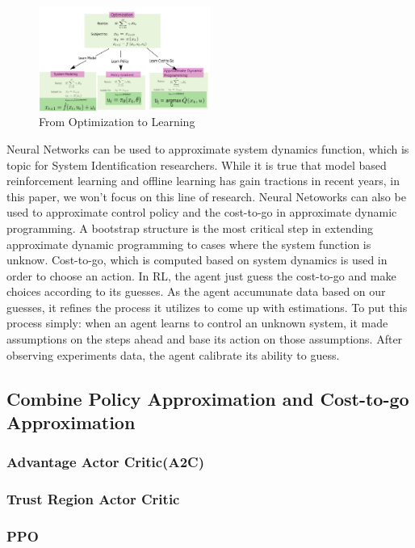 \documentclass[journal]{IEEEtran}
\begin{document}
\begin{figure}
    \centering
    \includegraphics[width=0.5\textwidth]{Control.png}
    \caption{From Optimization to Learning}
    \label{fig:1}
\end{figure}
Neural Networks can be used to approximate system dynamics function, which is topic for System Identification researchers. While it is true that model based reinforcement learning and offline learning has gain tractions in recent years, in this paper, we won't focus on this line of research. Neural Netoworks can also be used to approximate control policy and the cost-to-go in approximate dynamic programming. A bootstrap structure is the most critical step in extending approximate dynamic programming to cases where the system function is unknow. Cost-to-go, which is computed based on system dynamics is used in order to choose an action. In RL, the agent just guess the cost-to-go and make choices according to its guesses. As the agent accumunate data based on our guesses, it refines the process it utilizes to come up with estimations. To put this process simply: when an agent learns to control an unknown system, it made assumptions on the steps ahead and base its action on those assumptions. After observing experiments data, the agent calibrate its ability to guess.

\subsection{Combine Policy Approximation and Cost-to-go Approximation}
\subsubsection{Advantage Actor Critic(A2C)}
\subsubsection{Trust Region Actor Critic}
\subsubsection{PPO}
\end{document}
